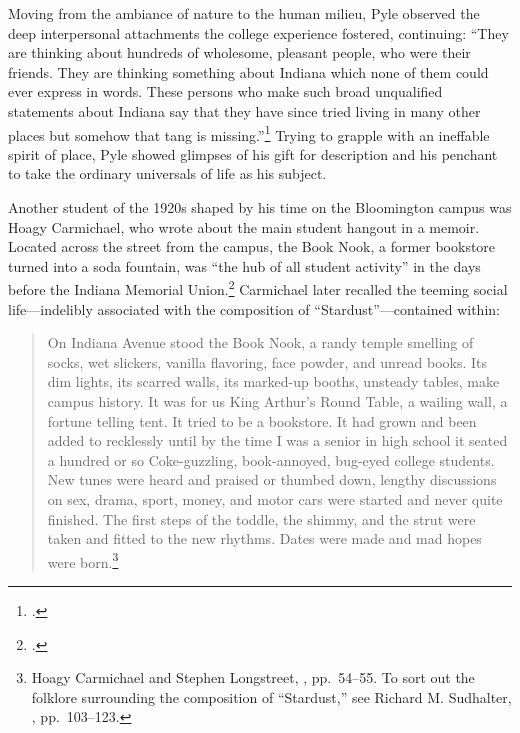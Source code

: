\documentclass[
  american,
  letterpaper,
]{scrreprt}
\begin{document}
Moving from the ambiance of nature to the human milieu, Pyle observed
the deep interpersonal attachments the college experience fostered,
continuing: ``They are thinking about hundreds of wholesome, pleasant
people, who were their friends. They are thinking something about
Indiana which none of them could ever express in words. These persons
who make such broad unqualified statements about Indiana say that they
have since tried living in many other places but somehow that tang is
missing.''\footnote{.} Trying
to grapple with an ineffable spirit of place, Pyle showed glimpses of
his gift for description and his penchant to take the ordinary
universals of life as his subject.

Another student of the 1920s shaped by his time on the Bloomington
campus was Hoagy Carmichael, who wrote about the main student hangout in
a memoir. Located across the street from the campus, the Book Nook, a
former bookstore turned into a soda fountain, was ``the hub of all
student activity'' in the days before the Indiana Memorial
Union.\footnote{.} Carmichael later recalled the teeming social life---indelibly
associated with the composition of ``Stardust''---contained within:

\begin{quote}
On Indiana Avenue stood the Book Nook, a randy temple smelling of socks,
wet slickers, vanilla flavoring, face powder, and unread books. Its dim
lights, its scarred walls, its marked-up booths, unsteady tables, make
campus history. It was for us King Arthur's Round Table, a wailing wall,
a fortune telling tent. It tried to be a bookstore. It had grown and
been added to recklessly until by the time I was a senior in high school
it seated a hundred or so Coke-guzzling, book-annoyed, bug-eyed college
students. New tunes were heard and praised or thumbed down, lengthy
discussions on sex, drama, sport, money, and motor cars were started and
never quite finished. The first steps of the toddle, the shimmy, and the
strut were taken and fitted to the new rhythms. Dates were made and mad
hopes were born.\footnote{Hoagy Carmichael and Stephen Longstreet,
  ,
  pp.~54--55. To sort out the folklore surrounding the composition of
  ``Stardust,'' see Richard M. Sudhalter,
  ,
  pp.~103--123.}
\end{quote}
\end{document}
